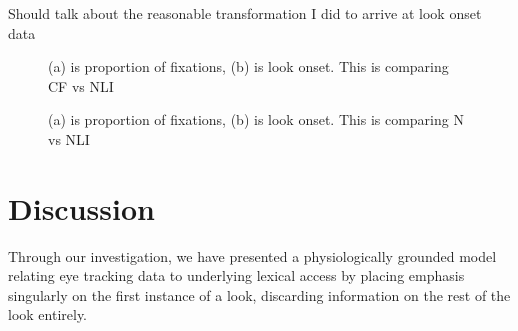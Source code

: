 Should talk about the reasonable transformation I did to arrive at look onset data

\begin{figure}[H]
    \centering
    \caption{(a) is proportion of fixations, (b) is look onset. This is comparing CF vs NLI}
\label{fig:irldata1}
\end{figure}

\begin{figure}[H]
    \centering
    \caption{(a) is proportion of fixations, (b) is look onset. This is comparing N vs NLI}
\label{fig:irldata2}
\end{figure}


\section{Discussion}


Through our investigation, we have presented a physiologically grounded model relating eye tracking data to underlying lexical access by placing emphasis singularly on the first instance of a look, discarding information on the rest of the look entirely. 

